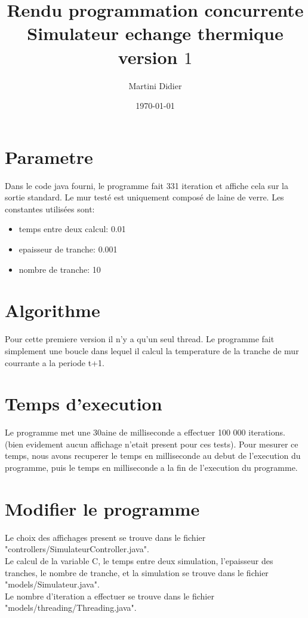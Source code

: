 \documentclass[11pt,a4paper,titlepage]{article}
\title{\blue Rendu programmation concurrente \\
\blueb Simulateur echange thermique version $1$}
\author{Martini Didier}
\date{\today}
\begin{document}
\maketitle

\section{Parametre}
Dans le code java fourni, le programme fait 331 iteration et affiche cela sur la sortie standard. 
Le mur testé est uniquement composé de laine de verre.
Les constantes utilisées sont:\\ 
\begin{itemize}
\item temps entre deux calcul: 0.01
\item epaisseur de tranche: 0.001
\item nombre de tranche: 10
\end{itemize}

\section{Algorithme}
Pour cette premiere version il n'y a qu'un seul thread.
Le programme fait simplement une boucle dans lequel il calcul la temperature de la tranche de mur courrante a la periode t+1.

\section{Temps d'execution}
Le programme met une 30aine de milliseconde a effectuer 100 000 iterations. (bien evidement aucun affichage n'etait present pour ces tests).
Pour mesurer ce temps, nous avons recuperer le temps en milliseconde au debut de l'execution du programme, 
puis le temps en milliseconde a la fin de l'execution du programme.

\section{Modifier le programme}
Le choix des affichages present se trouve dans le fichier "controllers/SimulateurController.java".\\
Le calcul de la variable C, le temps entre deux simulation, l'epaisseur des tranches, le nombre de tranche, et la simulation se trouve dans le fichier "models/Simulateur.java".\\
Le nombre d'iteration a effectuer se trouve dans le fichier "models/threading/Threading.java".\\
\end{document}
